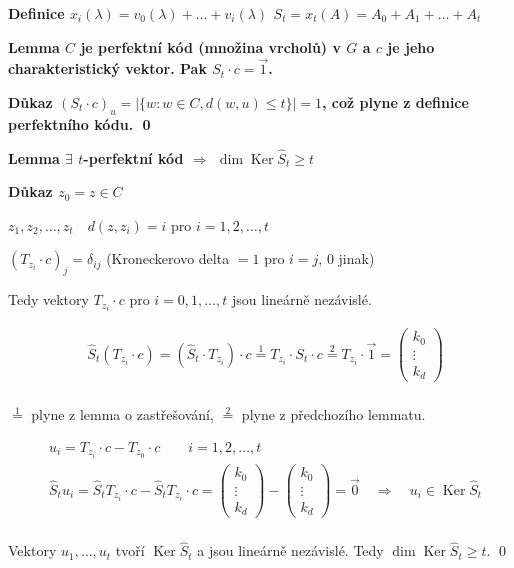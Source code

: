\documentclass[a4paper,12pt,titlepage]{article}
\newcommand{\lm}{\smallskip\noindent\bf Lemma\rm{} }
\newcommand{\dk}{\smallskip\noindent\bf Důkaz\rm{} }
\newcommand{\df}{\smallskip\noindent\bf Definice\rm{} }
\DeclareMathOperator{\Ker}{Ker}
\begin{document}
\df $x_i(\lambda) = v_0(\lambda) + \dots + v_i(\lambda)$ \hfil $S_t = x_t(A) = A_0 + A_1 + \dots + A_t$

\lm $C$ je perfektní kód (množina vrcholů) v $G$ a $c$ je jeho charakteristický vektor. Pak $S_t\cdot c = \vec 1$.

\dk $(S_t\cdot c)_u = |\{w: w\in C, d(w,u) \le t\}| = 1$, což plyne z definice perfektního kódu.
\qed

\lm $\exists$ $t$-perfektní kód $\Rightarrow$ $\dim \Ker \widehat S_t \ge t$

\dk $z_0 = z \in C$

$z_1,z_2,\dots,z_t \quad d(z,z_i) = i$ pro $i = 1,2,\dots,t$

$(T_{z_i} \cdot c)_j = \delta_{ij}$ (Kroneckerovo delta $= 1$ pro $i=j$, $0$ jinak)

Tedy vektory $T_{z_i} \cdot c$ pro $i = 0, 1, \dots, t$ jsou lineárně nezávislé.

\begin{align*}
	&\widehat S_t(T_{z_i}\cdot c) = (\widehat S_t \cdot T_{z_i}) \cdot c \overset{1}{=} T_{z_i} \cdot S_t \cdot c \overset{2}{=} T_{z_i}\cdot \vec 1 = \left(\begin{matrix}
		k_0 \\ \vdots \\ k_d
	\end{matrix}\right) \\
\end{align*}

$\overset{1}{=}$ plyne z lemma o zastřešování, $\overset{2}{=}$ plyne z předchozího lemmatu.

\begin{align*}
	&u_i = T_{z_i}\cdot c - T_{z_0}\cdot c\qquad i = 1, 2, \dots, t \\
	&\widehat S_t u_i = \widehat S_t T_{z_i}\cdot c - \widehat S_t T_{z_i}\cdot c = \left(\begin{matrix}k_0 \\ \vdots \\ k_d\end{matrix}\right) - \left(\begin{matrix}k_0 \\ \vdots \\ k_d\end{matrix}\right) = \vec 0 \quad\Rightarrow\quad u_i\in\Ker \widehat S_t\\
\end{align*}

Vektory $u_1,\dots, u_t$ tvoří $\Ker \widehat S_t$ a jsou lineárně nezávislé. Tedy $\dim\Ker\widehat S_t \ge t$.
\qed
\end{document}
